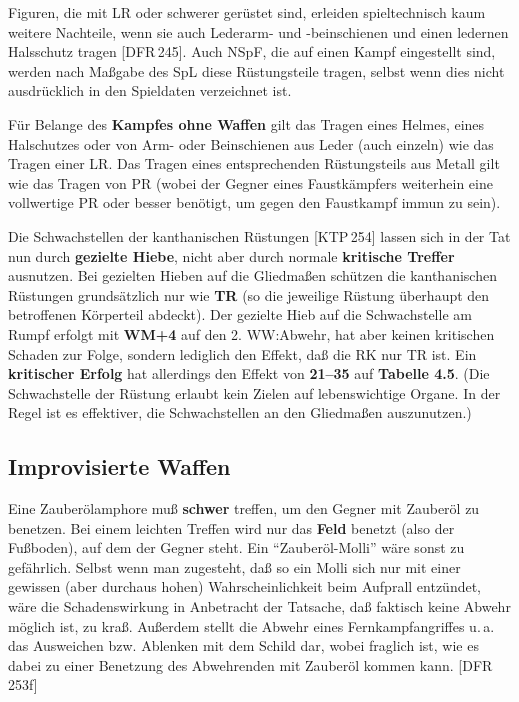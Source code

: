 \documentclass[10pt,a4paper,germanpar]{article}
\begin{document}
Figuren, die mit LR oder schwerer gerüstet sind, erleiden
spieltechnisch kaum weitere Nachteile, wenn sie auch Lederarm- und
-beinschienen und einen ledernen Halsschutz tragen [DFR\,245]. Auch
NSpF, die auf einen Kampf eingestellt sind, werden nach Maßgabe des
SpL diese Rüstungsteile tragen, selbst wenn dies nicht ausdrücklich in
den Spieldaten verzeichnet ist.

Für Belange des \textbf{Kampfes ohne Waffen} gilt das Tragen eines
Helmes, eines Halschutzes oder von Arm- oder Beinschienen aus Leder
(auch einzeln) wie das Tragen einer LR. Das Tragen eines
entsprechenden Rüstungsteils aus Metall gilt wie das Tragen von PR
(wobei der Gegner eines Faustkämpfers weiterhein eine vollwertige PR
oder besser benötigt, um gegen den Faustkampf immun zu sein).

Die Schwachstellen der kanthanischen Rüstungen [KTP\,254] lassen
sich in der Tat nun durch \textbf{gezielte Hiebe}, nicht aber durch
normale \textbf{kritische Treffer} ausnutzen. Bei gezielten Hieben auf
die Gliedmaßen schützen die kanthanischen Rüstungen grundsätzlich nur
wie \textbf{TR} (so die jeweilige Rüstung überhaupt den betroffenen
Körperteil abdeckt). Der gezielte Hieb auf die Schwachstelle am Rumpf
erfolgt mit \textbf{WM+4} auf den 2. WW:Abwehr, hat aber keinen
kritischen Schaden zur Folge, sondern lediglich den Effekt, daß die RK
nur TR ist. Ein \textbf{kritischer Erfolg} hat allerdings den Effekt
von \textbf{21--35} auf \textbf{Tabelle 4.5}. (Die Schwachstelle der
Rüstung erlaubt kein Zielen auf lebenswichtige Organe. In der Regel
ist es effektiver, die Schwachstellen an den Gliedmaßen auszunutzen.)

% 

\subsection{Improvisierte Waffen}

Eine Zauberölamphore muß \textbf{schwer} treffen, um den Gegner mit
Zauberöl zu benetzen.  Bei einem leichten Treffen wird nur das
\textbf{Feld} benetzt (also der Fußboden), auf dem der Gegner steht.
Ein "`Zauberöl-Molli"' wäre sonst zu gefährlich. Selbst wenn man
zugesteht, daß so ein Molli sich nur mit einer gewissen (aber durchaus
hohen) Wahrscheinlichkeit beim Aufprall entzündet, wäre die
Schadenswirkung in Anbetracht der Tatsache, daß faktisch keine Abwehr
möglich ist, zu kraß. Außerdem stellt die Abwehr eines
Fernkampfangriffes u.\,a. das Ausweichen bzw. Ablenken mit dem Schild
dar, wobei fraglich ist, wie es dabei zu einer Benetzung des
Abwehrenden mit Zauberöl kommen kann. [DFR\,253f]
\end{document}
